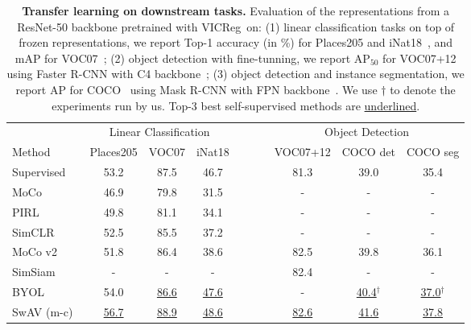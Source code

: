 \documentclass{article} %
\newcommand{\algo}{VICReg}
\begin{document}
\begin{table}[t]
\centering
    \caption{\textbf{Transfer learning on downstream tasks.} Evaluation of the representations from a ResNet-50 backbone pretrained with \algo \ on: (1) linear classification tasks on top of frozen representations, we report Top-1 accuracy (in \%) for Places205 \cite{zhou2014places} and iNat18~\cite{vanhorni2018naturalist}, and mAP for VOC07~\cite{everingham2010voc}; (2) object detection with fine-tunning, we report AP$_{50}$ for VOC07+12 using Faster R-CNN with C4 backbone~\cite{ren2015fasterrcnn}; (3) object detection and instance segmentation, we report AP for COCO~\cite{lin2014coco} using Mask R-CNN with FPN backbone~\cite{he2017maskrcnn}. We use ${\dagger}$ to denote the experiments run by us. Top-3 best self-supervised methods are \underline{underlined}.}
    \label{tab:transfer_learning}
    \vspace{-0.5em}
  \setlength{\tabcolsep}{2.0pt}
    \begin{tabular}{ @{} l ccc c ccc @{} }
      \toprule
       & \multicolumn{3}{c}{Linear Classification} &~~~~& \multicolumn{3}{c}{Object Detection}\\
\cmidrule{2-4}\cmidrule{6-8}
	   Method  & Places205 & VOC07 & iNat18 && VOC07+12 & COCO det & COCO seg \\
      \midrule
	    Supervised                          & 53.2  & 87.5 & 46.7 && 81.3 & 39.0 & 35.4 \\
      \midrule
	    MoCo~\cite{he2020moco}              & 46.9 & 79.8 & 31.5 && - & - & - \\
	    PIRL~\cite{misra2020pirl}           & 49.8 & 81.1 & 34.1 && - & - & - \\
	    SimCLR~\cite{chen2020simclr}        & 52.5 & 85.5 & 37.2 && - & - & -\\
	    MoCo v2~\cite{chen2020mocov2}       & 51.8 & 86.4 & 38.6 && 82.5 & 39.8 & 36.1 \\
	    SimSiam~\cite{chen2020simsiam}      & -      & -      & -      && 82.4 & - & - \\
	    BYOL~\cite{grill2020byol}           & 54.0 & \underline{86.6} & \underline{47.6} && - & \hspace{0.41em}\underline{40.4}$^{\dagger}$ & \hspace{0.41em}\underline{37.0}$^{\dagger}$ \\
	    SwAV (m-c)~\cite{caron2020swav}           & \underline{56.7} & \underline{88.9} & \underline{48.6} && \underline{82.6} & \underline{41.6} & \underline{37.8} \\

\end{tabular}
\end{table}
\end{document}
